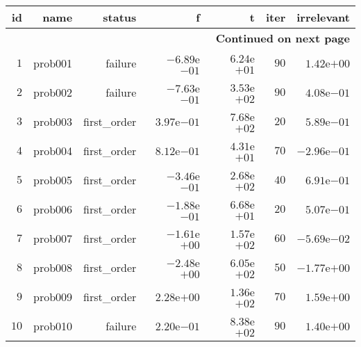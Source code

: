 \documentclass[varwidth=20cm,crop=true]{standalone}
\begin{document}
\begin{longtable}{rrrrrrr}
\hline
id & name & status & f & t & iter & irrelevant \\\hline
\endhead
\hline
\multicolumn{7}{r}{{\bfseries Continued on next page}}\\
\hline
\endfoot
\endlastfoot
\(     1\) & prob001 & failure & \(-6.89\)e\(-01\) & \( 6.24\)e\(+01\) & \(    90\) & \( 1.42\)e\(+00\) \\
\(     2\) & prob002 & failure & \(-7.63\)e\(-01\) & \( 3.53\)e\(+02\) & \(    90\) & \( 4.08\)e\(-01\) \\
\(     3\) & prob003 & first\_order & \( 3.97\)e\(-01\) & \( 7.68\)e\(+02\) & \(    20\) & \( 5.89\)e\(-01\) \\
\(     4\) & prob004 & first\_order & \( 8.12\)e\(-01\) & \( 4.31\)e\(+01\) & \(    70\) & \(-2.96\)e\(-01\) \\
\(     5\) & prob005 & first\_order & \(-3.46\)e\(-01\) & \( 2.68\)e\(+02\) & \(    40\) & \( 6.91\)e\(-01\) \\
\(     6\) & prob006 & first\_order & \(-1.88\)e\(-01\) & \( 6.68\)e\(+01\) & \(    20\) & \( 5.07\)e\(-01\) \\
\(     7\) & prob007 & first\_order & \(-1.61\)e\(+00\) & \( 1.57\)e\(+02\) & \(    60\) & \(-5.69\)e\(-02\) \\
\(     8\) & prob008 & first\_order & \(-2.48\)e\(+00\) & \( 6.05\)e\(+02\) & \(    50\) & \(-1.77\)e\(+00\) \\
\(     9\) & prob009 & first\_order & \( 2.28\)e\(+00\) & \( 1.36\)e\(+02\) & \(    70\) & \( 1.59\)e\(+00\) \\
\(    10\) & prob010 & failure & \( 2.20\)e\(-01\) & \( 8.38\)e\(+02\) & \(    90\) & \( 1.40\)e\(+00\) \\\hline
\end{longtable}
\end{document}
